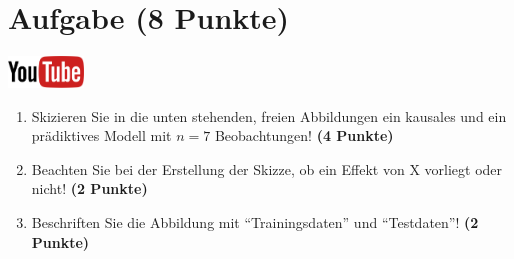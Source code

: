 \documentclass[a4paper, 9pt]{scrartcl}\usepackage[]{graphicx}\usepackage[]{xcolor}
\begin{document}
\clearpage

\section{Aufgabe \hfill (8 Punkte)}

\hfill\href{https://youtu.be/C_a8aOMI7GE}{\includegraphics[width =
  2cm]{img/youtube}}\\[1Ex]



\begin{enumerate}
\item Skizieren Sie in die unten stehenden, freien Abbildungen ein kausales
  und ein pr{\"a}diktives Modell mit $n = 7$
  Beobachtungen! \textbf{(4 Punkte)}
\item Beachten Sie bei der Erstellung der Skizze, ob ein Effekt von X
  vorliegt oder nicht! \textbf{(2 Punkte)}
\item Beschriften Sie die Abbildung mit "`Trainingsdaten"' und "`Testdaten"'!  \textbf{(2 Punkte)}
\end{enumerate}
\end{document}
